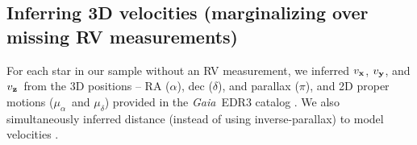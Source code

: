 \documentclass[]{aastex631}
\newcommand{\ie}{{\it i.e.}}
\newcommand{\eg}{{\it e.g.}}
\newcommand{\kepler}{{Kepler}}
\newcommand{\gaia}{{\it Gaia}}
\newcommand{\degrees}{$^\circ$}
\newcommand{\vx}{$v_{\bf x}$}
\newcommand{\vy}{$v_{\bf y}$}
\newcommand{\vz}{$v_{\bf z}$}
\newcommand{\vb}{$v_{\bf b}$}
\newcommand{\mura}{$\mu_\alpha$}
\newcommand{\mudec}{$\mu_\delta$}
\newcommand{\parallax}{$\pi$}
\newcommand{\ra}{$\alpha$}
\newcommand{\dec}{$\delta$}
\begin{document}

\subsection{Inferring 3D velocities (marginalizing over missing RV
measurements)}
\label{sec:inference}

For each star in our sample without an RV measurement, we inferred \vx, \vy,
and \vz\ from the 3D positions -- RA (\ra), dec (\dec), and parallax
(\parallax), and 2D proper motions (\mura\ and \mudec) provided in the \gaia\
EDR3 catalog \citep{gaia_edr3}.
We also simultaneously inferred distance (instead of using inverse-parallax)
to model velocities \citep[see \eg][]{bailer-jones2015, bailer-jones2018}.
\end{document}
